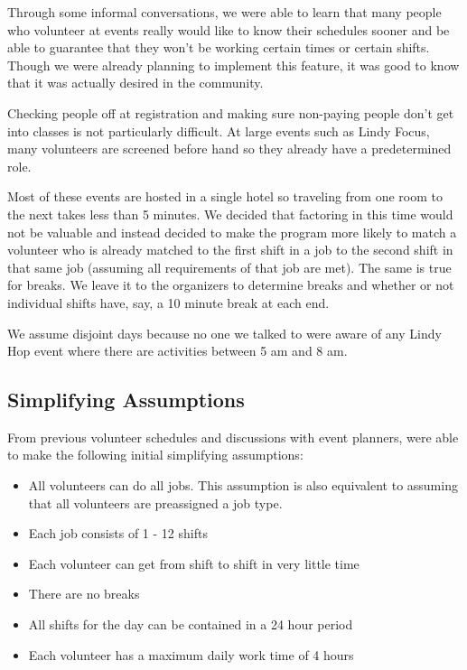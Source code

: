 \documentclass[11pt]{article}
\theoremstyle{definition}
\begin{document}
\begin{multicols}{2}
\begin{itemize}
\end{itemize}

Through some informal conversations, we were able to learn that many people who volunteer at events really would like to know their schedules sooner and be able to guarantee that they won't be working certain times or certain shifts.
Though we were already planning to implement this feature, it was good to know that it was actually desired in the community.

Checking people off at registration and making sure non-paying people don't get into classes is not particularly difficult.
At large events such as Lindy Focus, many volunteers are screened before hand so they already have a predetermined role.

Most of these events are hosted in a single hotel so traveling from one room to the next takes less than 5 minutes.
We decided that factoring in this time would not be valuable and instead decided to make the program more likely to match a volunteer who is already matched to the first shift in a job to the second shift in that same job (assuming all requirements of that job are met).
The same is true for breaks.
We leave it to the organizers to determine breaks and whether or not individual shifts have, say, a 10 minute break at each end.

We assume disjoint days because no one we talked to were aware of any Lindy Hop event where there are activities between 5 am and 8 am.

\subsection{Simplifying Assumptions}
From previous volunteer schedules and discussions with event planners, were able to make the following initial simplifying assumptions:
\begin{itemize}\itemsep0pt
\item All volunteers can do all jobs. This assumption is also equivalent to assuming that all volunteers are preassigned a job type.
\item Each job consists of 1 - 12 shifts
\item Each volunteer can get from shift to shift in very little time
\item There are no breaks
\item All shifts for the day can be contained in a 24 hour period
\item Each volunteer has a maximum daily work time of 4 hours
\end{itemize}
%
%

\end{multicols}
\end{document}
